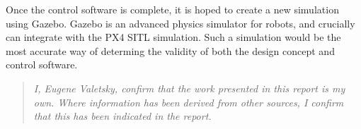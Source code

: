 \documentclass[11pt]{article}
\begin{document}
Once the control software is complete, it is hoped to create a new simulation using Gazebo. Gazebo is an advanced physics simulator for robots, and crucially can integrate with the PX4 SITL simulation. Such a simulation would be the most accurate way of determing the validity of both the design concept and control software.

\vfil
\begin{quote}
    \emph{I, Eugene Valetsky, confirm that the work presented in this report is my own. Where information has been derived from other sources, I confirm that this has been indicated in the report.}
\end{quote}

\end{document}
